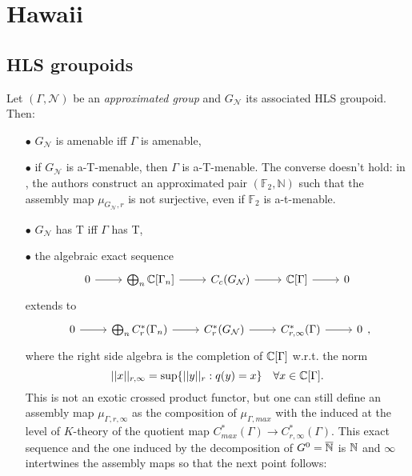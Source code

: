 \section{Hawaii}

\subsection{HLS groupoids}

Let $(\Gamma,\mathcal N)$ be an \textit{approximated group} and $G_{\mathcal N}$ its associated HLS groupoid. Then:

\begin{itemize}
\item[$\bullet$] $G_{\mathcal N}$ is amenable iff $\Gamma$ is amenable,\\

\item[$\bullet$] if $G_{\mathcal N}$ is a-T-menable, then $\Gamma$ is a-T-menable. The converse doesn't hold: in \cite{HLS}, the authors construct an approximated pair $(\mathbb F_2, \mathbb N)$ such that the assembly map $\mu_{G_{\mathcal N},r }$ is not surjective, even if $\mathbb F_2$ is a-t-menable. \\

\item[$\bullet$] $G_{\mathcal N}$ has T iff $\Gamma$ has T,\\

\item[$\bullet$] the algebraic exact sequence
\[\begin{tikzcd}0 \arrow{r} & \bigoplus_n \C[\Gamma_n] \arrow{r} & C_c(G_{\mathcal N})\arrow{r} &  \C [\Gamma]\arrow{r} & 0 \end{tikzcd}\]
extends to 
\[\begin{tikzcd}0 \arrow{r} & \bigoplus_n C^*_{r}(\Gamma_n) \arrow{r} & C^*_r(G_{\mathcal N})\arrow{r} &  C^*_{r,\infty}(\Gamma)\arrow{r} & 0 \end{tikzcd},\]
where the right side algebra is the completion of $\mathbb C[\Gamma]$ w.r.t. the norm 
\[ ||x||_{r,\infty} = \sup \{ ||y ||_r : q(y)=x\} \quad \forall x \in \mathbb C [\Gamma].\]
This is not an exotic crossed product functor, but one can still define an assembly map $\mu_{\Gamma, r, \infty}$ as the composition of $\mu_{\Gamma,max}$ with the induced at the level of $K$-theory of the quotient map $C_{max}^*(\Gamma) \rightarrow C_{r,\infty}^*(\Gamma) $. This exact sequence and the one induced by the decomposition of $G^0 = \overline {\mathbb N}$ is $\mathbb N$ and $\infty$ intertwines the assembly maps so that the next point follows:\\


\end{itemize}
